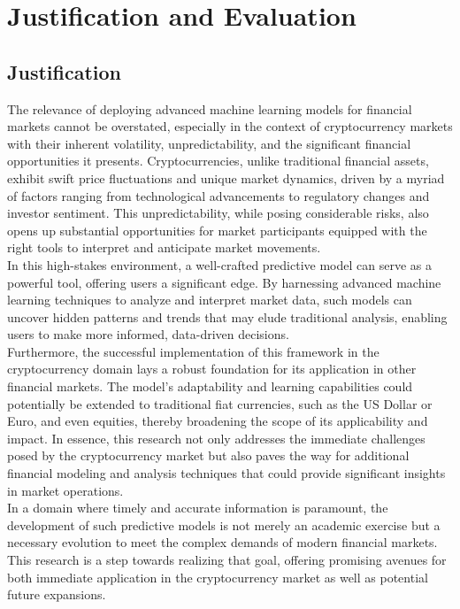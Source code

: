 \chapter{Justification and Evaluation}


\section{Justification}

The relevance of deploying advanced machine learning models for financial markets cannot be overstated, especially in the context of cryptocurrency markets with their inherent volatility, unpredictability, and the significant financial opportunities it presents. Cryptocurrencies, unlike traditional financial assets, exhibit swift price fluctuations and unique market dynamics, driven by a myriad of factors ranging from technological advancements to regulatory changes and investor sentiment. This unpredictability, while posing considerable risks, also opens up substantial opportunities for market participants equipped with the right tools to interpret and anticipate market movements.\\

In this high-stakes environment, a well-crafted predictive model can serve as a powerful tool, offering users a significant edge. By harnessing advanced machine learning techniques to analyze and interpret market data, such models can uncover hidden patterns and trends that may elude traditional analysis, enabling users to make more informed, data-driven decisions.\\

Furthermore, the successful implementation of this framework in the cryptocurrency domain lays a robust foundation for its application in other financial markets. The model's adaptability and learning capabilities could potentially be extended to traditional fiat currencies, such as the US Dollar or Euro, and even equities, thereby broadening the scope of its applicability and impact. In essence, this research not only addresses the immediate challenges posed by the cryptocurrency market but also paves the way for additional financial modeling and analysis techniques that could provide significant insights in market operations. \\

In a domain where timely and accurate information is paramount, the development of such predictive models is not merely an academic exercise but a necessary evolution to meet the complex demands of modern financial markets. This research is a step towards realizing that goal, offering promising avenues for both immediate application in the cryptocurrency market as well as potential future expansions. \\

